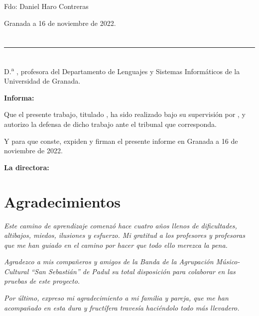 \vspace{6cm}

\noindent Fdo: Daniel Haro Contreras

\vspace{2cm}

\begin{flushright}
Granada a 16 de noviembre de 2022.
\end{flushright}


\chapter*{}
\thispagestyle{empty}

\noindent\rule[-1ex]{\textwidth}{2pt}\\[4.5ex]

D.\textsuperscript{a} \textbf{\myProf}, profesora del Departamento de Lenguajes y Sistemas Informáticos de la Universidad de Granada.


\vspace{0.5cm}

\textbf{Informa:}

\vspace{0.5cm}

Que el presente trabajo, titulado \textit{\textbf{\myTitle}},
ha sido realizado bajo su supervisión por \textbf{\myName}, y autorizo la defensa de dicho trabajo ante el tribunal
que corresponda.

\vspace{0.5cm}

Y para que conste, expiden y firman el presente informe en Granada a 16 de noviembre de 2022.

\vspace{1cm}

\textbf{La directora:}

\vspace{5cm}

\noindent \textbf{\myProf}

\chapter*{Agradecimientos}
\thispagestyle{empty}

       \vspace{1cm}


\textit{Este camino de aprendizaje comenzó hace cuatro años llenos de dificultades, altibajos, miedos, ilusiones y esfuerzo. Mi gratitud a los profesores y profesoras que me han guiado en el camino por hacer que todo ello merezca la pena.}

\textit{Agradezco a mis compañeros y amigos de la Banda de la Agrupación Músico-Cultural ``San Sebastián'' de Padul su total disposición para colaborar en las pruebas de este proyecto.}

\textit{Por último, expreso mi agradecimiento a mi familia y pareja, que me han acompañado en esta dura y fructífera travesía haciéndolo todo más llevadero.}
